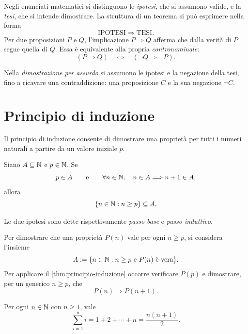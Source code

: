 Negli enunciati matematici si distinguono le \emph{ipotesi},
che si assumono valide, e la \emph{tesi}, che si intende dimostrare.
La struttura di un teorema si può esprimere nella forma
\[
  \text{IPOTESI}\Longrightarrow\text{TESI}.
\]
Per due proposizioni \(P\) e \(Q\), l'implicazione
\(P\Longrightarrow Q\) afferma che dalla verità di \(P\)
segue quella di \(Q\). Essa è equivalente alla propria
\emph{contronominale}:
\[
  (P\Longrightarrow Q)
  \quad\Longleftrightarrow\quad
  (\neg Q\Longrightarrow\neg P).
\]

Nella \emph{dimostrazione per assurdo} si assumono le ipotesi e
la negazione della tesi, fino a ricavare una contraddizione: una
proposizione \(C\) e la sua negazione \(\neg C\).


\section{Principio di induzione}
\label{sec:lez01-induzione}

Il principio di induzione consente di dimostrare una proprietà
per tutti i numeri naturali a partire da un valore iniziale \(p\).

\begin{theorem}
\label{thm:principio-induzione}
Siano \(A\subseteq\mathbb{N}\) e \(p\in\mathbb{N}\). Se
\[
  p\in A
  \qquad\text{e}\qquad
  \forall n\in\mathbb{N},\quad n\in A\Longrightarrow n+1\in A,
\]
allora
\[
  \{n\in\mathbb{N}:n\ge p\}\subseteq A.
\]
\end{theorem}

Le due ipotesi sono dette rispettivamente \emph{passo base}
e \emph{passo induttivo}.

Per dimostrare che una proprietà \(P(n)\) vale per ogni
\(n\ge p\), si considera l'insieme
\[
  A:=\{n\in\mathbb{N}:n\ge p\text{ e }P(n)\text{ è vera}\}.
\]
Per applicare il \cref{thm:principio-induzione} occorre
verificare \(P(p)\) e dimostrare, per un generico \(n\ge p\), che
\[
  P(n)\Longrightarrow P(n+1).
\]

\begin{example}
\label{ex:somma-primi-naturali}
Per ogni \(n\in\mathbb{N}\) con \(n\ge1\), vale
\[
  \sum_{i=1}^{n}i
  =1+2+\cdots+n
  =\frac{n(n+1)}2.
\]
\end{example}


